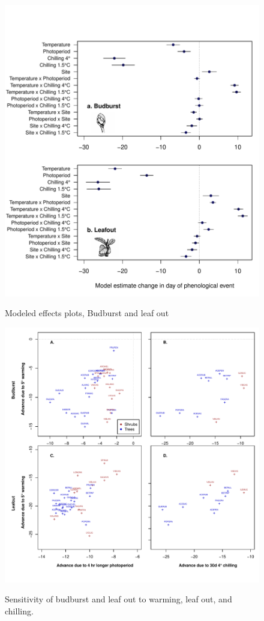 \documentclass[12pt]{article}
\begin{document}
\begin{figure}
\begin{center}
\caption{Modeled effects plots, Budburst and leaf out}
\includegraphics[scale=0.8]{Fig1_bb_lo}
\label{fig2}
\end{center}
\end{figure}


\begin{figure}
\caption{Sensitivity of budburst and leaf out to warming, leaf out, and chilling.}
\includegraphics[scale=0.9]{Fig2_4panel}
\label{fig3}
\end{figure}
\end{document}
